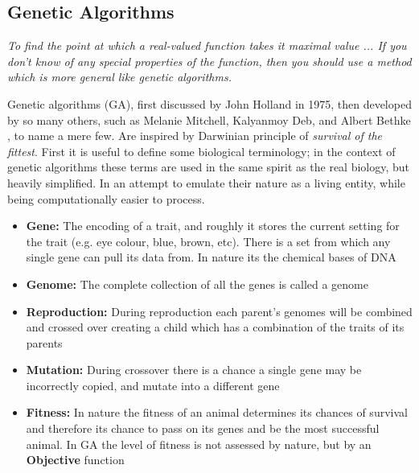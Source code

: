 \documentclass[12pt]{article}
\begin{document}
\subsection{Genetic Algorithms}\label{section:GA}

    \begin{displayquote} \textit {
        To find the point at which a real-valued function takes it maximal value ...
        If you don't know of any special properties of the function, then you
        should use a method which is more general like genetic algorithms.
    } \end{displayquote}

    Genetic algorithms (GA), first 
    discussed by John Holland \cite{Holland} in 1975, then developed by so many
    others, such as Melanie Mitchell, Kalyanmoy Deb, and Albert Bethke
    \cite{Mitchell, KalyanmoyDeb, Bethke}, to name a mere few. Are inspired by Darwinian
    principle of \textit{survival of the fittest}.
    First it is useful to define some biological terminology; in the context of
    genetic algorithms these terms are used in the same spirit as the real biology,
    but heavily simplified. In an attempt to emulate their nature as a living entity,
    while being computationally easier to process.

    \begin{itemize}
        \item{\textbf{Gene:} The encoding of a trait, and roughly it stores the current
            setting for the trait (e.g. eye colour, blue, brown, etc). There is a set
            from which any single gene can pull its data from. In nature its the chemical
            bases  of DNA}
        \item{\textbf{Genome:} The complete collection of all the genes is called a
            genome}
        \item{\textbf{Reproduction:} During reproduction each parent's genomes will be
            combined and crossed over creating a child which has a combination of
            the traits of its parents}
        \item{\textbf{Mutation:} During crossover there is a chance a single gene
            may be incorrectly copied, and mutate into a different gene}
        \item{\textbf{Fitness: } In nature the fitness of an animal determines
            its chances of survival and therefore its chance to pass on its genes
            and be the most successful animal. In GA the level of fitness is not assessed
            by nature, but by an \textbf{Objective} function}
    \end{itemize}
\end{document}
